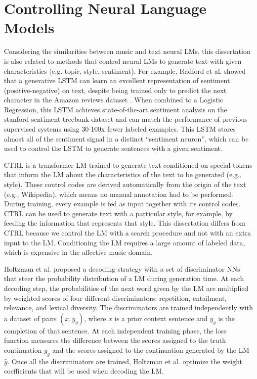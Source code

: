 
\section{Controlling Neural Language Models}

Considering the similarities between music and text neural LMs, this dissertation is also related to methods that control neural LMs to generate text with given characteristics (e.g. topic, style, sentiment). For example, Radford et al. \cite{radford_2017} showed that a generative LSTM can learn an excellent representation of sentiment (positive-negative) on text, despite being trained only to predict the next character in the Amazon reviews  dataset \cite{He2016}. When combined to a Logistic Regression, this LSTM achieves state-of-the-art sentiment analysis on the stanford sentiment treebank dataset \cite{socher2013recursive} and can match the performance of previous supervised systems using 30-100x fewer labeled examples. This LSTM stores almost all of the sentiment signal in a distinct ``sentiment neuron'', which can be used to control the LSTM to generate sentences with a given sentiment.

CTRL \cite{keskar2019ctrl} is a transformer LM trained to generate text conditioned on special tokens that inform the LM about the characteristics of the text to be generated (e.g., style). These control codes are derived automatically from the origin of the text (e.g., Wikipedia), which means no manual annotation had to be performed. During training, every example is fed as input together with its control codes. CTRL can be used to generate text with a particular style, for example, by feeding the information that represents that style. This dissertation differs from CTRL because we control the LM with a search procedure and not with an extra input to the LM. Conditioning the LM requires a large amount of labeled data, which is expensive in the affective music domain.

Holtzman et al. \cite{holtzman2018learning} proposed a decoding strategy with a set of discriminator NNs that steer the probability distribution of a LM during generation time. At each decoding step, the probabilities of the next word given by the LM are multiplied by weighted scores of four different discriminators: repetition, entailment, relevance, and lexical diversity. The discriminators are trained independently with a dataset of pairs $(x, y_g)$, where $x$ is a prior context sentence and $y_g$ is the completion of that sentence. At each independent training phase, the loss function measures the difference between the scores assigned to the truth continuation $y_g$ and the scores assigned to the continuation generated by the LM $\hat{y}$. Once all the discriminators are trained, Holtzman et al. \cite{holtzman2018learning} optimize the weight coefficients that will be used when decoding the LM.

